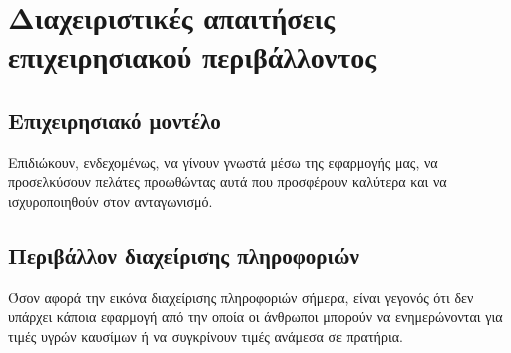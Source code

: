 \section{Διαχειριστικές απαιτήσεις επιχειρησιακού περιβάλλοντος}

\subsection{Επιχειρησιακό μοντέλο}
Επιδιώκουν, ενδεχομένως, να γίνουν γνωστά μέσω της εφαρμογής μας, να προσελκύσουν πελάτες προωθώντας αυτά που προσφέρουν καλύτερα και να ισχυροποιηθούν στον ανταγωνισμό.

\subsection{Περιβάλλον διαχείρισης πληροφοριών}
Όσον αφορά την εικόνα διαχείρισης πληροφοριών σήμερα, είναι γεγονός ότι δεν υπάρχει κάποια εφαρμογή από την οποία οι άνθρωποι μπορούν να ενημερώνονται για τιμές υγρών καυσίμων ή να συγκρίνουν τιμές ανάμεσα σε πρατήρια.
